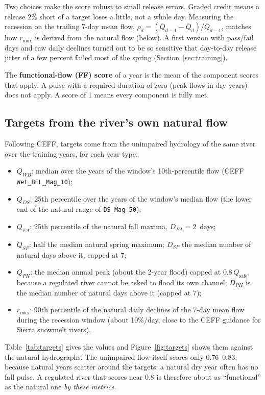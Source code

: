 \documentclass[11pt]{article}
\newcommand{\Qsafe}{Q_{\mathrm{safe}}}
\newcommand{\code}[1]{\texttt{#1}}
\begin{document}
\noindent Two choices make the score robust to small release errors.
Graded credit means a release 2\% short of a target loses a little, not a
whole day. Measuring the recession on the trailing 7-day mean flow,
$\rho_d=(\bar Q_{d-1}-\bar Q_d)/\bar Q_{d-1}$, matches how $r_{\max}$ is
derived from the natural flow (below). A first version with pass/fail
days and raw daily declines turned out to be so sensitive that day-to-day
release jitter of a few percent failed most of the spring
(Section~\ref{sec:training}).

\noindent The \textbf{functional-flow (FF) score} of a year is the mean of
the component scores that apply. A pulse with a required duration of zero
(peak flows in dry years) does not apply. A score of 1 means every
component is fully met.

\subsection{Targets from the river's own natural flow}
Following CEFF, targets come from the unimpaired hydrology of the same river
over the training years, for each year type:
\begin{itemize}
\item $Q_{WB}$: median over the years of the window's 10th-percentile flow (CEFF
  \code{Wet\_BFL\_Mag\_10});
\item $Q_{DS}$: 25th percentile over the years of the window's median flow (the
  lower end of the natural range of \code{DS\_Mag\_50});
\item $Q_{FA}$: 25th percentile of the natural fall maxima, $D_{FA}=2$~days;
\item $Q_{SP}$: half the median natural spring maximum; $D_{SP}$ the median number
  of natural days above it, capped at 7;
\item $Q_{PK}$: the median annual peak (about the 2-year flood) capped at
  $0.8\,\Qsafe$, because a regulated river cannot be asked to flood its own
  channel; $D_{PK}$ is the median number of natural days above it (capped at 7);
\item $r_{\max}$: 90th percentile of the natural daily declines of the 7-day mean
  flow during the recession window (about 10\%/day, close to the CEFF
  guidance for Sierra snowmelt rivers).
\end{itemize}
Table~\ref{tab:targets} gives the values and Figure~\ref{fig:targets} shows
them against the natural hydrographs. The unimpaired flow itself scores
only 0.76--0.83, because natural years scatter around the targets: a
natural dry year often has no fall pulse. A regulated river that
scores near 0.8 is therefore about as ``functional'' as the natural one
\emph{by these metrics}.
\end{document}
